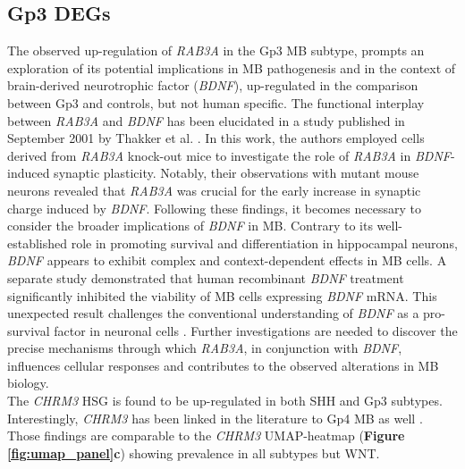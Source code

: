 \documentclass[10pt]{SelfArx} %
\begin{document}
\subsection{Gp3 DEGs}\label{sec:GP3_DE}
The observed up-regulation of \textit{RAB3A} in the Gp3 MB subtype, prompts an exploration of its potential implications in MB pathogenesis and in the context of brain-derived neurotrophic factor (\textit{BDNF}), up-regulated in the comparison between Gp3 and controls, but not human specific. The functional interplay between \textit{RAB3A} and \textit{BDNF} has been elucidated in a study published in September 2001 by Thakker et al. \cite{thakker2001rab3a}. In this work, the authors employed cells derived from \textit{RAB3A} knock-out mice to investigate the role of \textit{RAB3A} in \textit{BDNF}-induced synaptic plasticity. Notably, their observations with mutant mouse neurons revealed that \textit{RAB3A} was crucial for the early increase in synaptic charge induced by \textit{BDNF}.
Following these findings, it becomes necessary to consider the broader implications of \textit{BDNF} in MB. Contrary to its well-established role in promoting survival and differentiation in hippocampal neurons, \textit{BDNF} appears to exhibit complex and context-dependent effects in MB cells. A separate study \cite{schmidt2010bdnf} demonstrated that human recombinant \textit{BDNF} treatment significantly inhibited the viability of MB cells expressing \textit{BDNF} mRNA. This unexpected result challenges the conventional understanding of \textit{BDNF} as a pro-survival factor in neuronal cells \cite{bath2006variant, huang2003trk}.
Further investigations are needed to discover the precise mechanisms through which \textit{RAB3A}, in conjunction with \textit{BDNF}, influences cellular responses and contributes to the observed alterations in MB biology.
\\

The \textit{CHRM3} HSG is found to be up-regulated in both SHH and Gp3 subtypes. Interestingly, \textit{CHRM3} has been linked in the literature to Gp4 MB as well \cite{northcott2011medulloblastoma}. Those findings are comparable to the \textit{CHRM3} UMAP-heatmap (\textbf{Figure \ref{fig:umap_panel}c}) showing prevalence in all subtypes but WNT.\\
\end{document}

